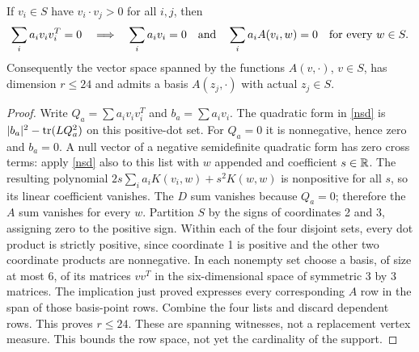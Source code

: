 \begin{lemma}\label{propagate}
If $v_i\in S$ have $v_i\cdot v_j>0$ for all $i,j$, then
\[
 \sum_i a_i v_iv_i^T=0
 \quad\Longrightarrow\quad
 \sum_i a_i v_i=0\quad\hbox{and}\quad
 \sum_i a_i A(v_i,w)=0\quad\hbox{for every }w\in S.
\]
Consequently the vector space spanned by the functions $A(v,\cdot)$, $v\in S$,
has dimension $r\le24$ and admits a basis $A(z_j,\cdot)$ with actual $z_j\in S$.
\end{lemma}
\begin{proof}
Write $Q_a=\sum a_i v_iv_i^T$ and $b_a=\sum a_i v_i$.
The quadratic form in \eqref{nsd} is $|b_a|^2-\operatorname{tr}(LQ_a^2)$ on this positive-dot set.
For $Q_a=0$ it is nonnegative, hence zero and $b_a=0$.
A null vector of a negative semidefinite quadratic form has zero cross terms:
apply \eqref{nsd} also to this list with $w$ appended and coefficient $s\in\mathbb R$.
The resulting polynomial $2s\sum_i a_iK(v_i,w)+s^2K(w,w)$ is nonpositive for all $s$,
so its linear coefficient vanishes. The $D$ sum vanishes because $Q_a=0$;
therefore the $A$ sum vanishes for every $w$.
Partition $S$ by the signs of coordinates 2 and 3, assigning zero to the positive sign.
Within each of the four disjoint sets, every dot product is strictly positive,
since coordinate 1 is positive and the other two coordinate products are nonnegative.
In each nonempty set choose a basis, of size at most 6, of its matrices $vv^T$
in the six-dimensional space of symmetric $3$ by $3$ matrices.
The implication just proved expresses every corresponding $A$ row in the span
of those basis-point rows. Combine the four lists and discard dependent rows.
This proves $r\le24$. These are spanning witnesses, not a replacement vertex measure.
This bounds the row space, not yet the cardinality of the support.
\end{proof}
